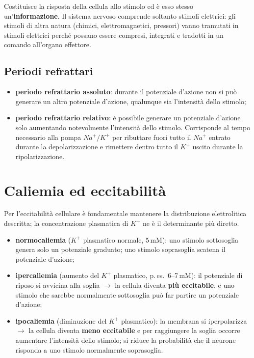 Costituisce la risposta della cellula allo stimolo ed è esso stesso un'\textbf{informazione}. Il
sistema nervoso comprende soltanto stimoli elettrici: gli stimoli di altra natura (chimici,
elettromagnetici, pressori) vanno tramutati in stimoli elettrici perché possano essere compresi,
integrati e tradotti in un comando all'organo effettore.

\subsection{Periodi refrattari}

\begin{itemize}
  \item \textbf{periodo refrattario assoluto}: durante il potenziale d'azione non si può generare
    un altro potenziale d'azione, qualunque sia l'intensità dello stimolo;
  \item \textbf{periodo refrattario relativo}: è possibile generare un potenziale d'azione solo
    aumentando notevolmente l'intensità dello stimolo. Corrisponde al tempo necessario alla pompa
    $Na^+/K^+$ per ributtare fuori tutto il $Na^+$ entrato durante la depolarizzazione e rimettere
    dentro tutto il $K^+$ uscito durante la ripolarizzazione.
\end{itemize}

\section{Caliemia ed eccitabilità}

Per l'eccitabilità cellulare è fondamentale mantenere la distribuzione elettrolitica descritta; la
concentrazione plasmatica di $K^+$ ne è il determinante più diretto.
\begin{itemize}
  \item \textbf{normocaliemia} ($K^+$ plasmatico normale, 5\,mM): uno stimolo sottosoglia genera
    solo un potenziale graduato; uno stimolo soprasoglia scatena il potenziale d'azione;
  \item \textbf{ipercaliemia} (aumento del $K^+$ plasmatico, p.\,es.\ 6--7\,mM): il potenziale di
    riposo si avvicina alla soglia $\rightarrow$ la cellula diventa \textbf{più eccitabile}, e uno
    stimolo che sarebbe normalmente sottosoglia può far partire un potenziale d'azione;
  \item \textbf{ipocaliemia} (diminuzione del $K^+$ plasmatico): la membrana si iperpolarizza
    $\rightarrow$ la cellula diventa \textbf{meno eccitabile} e per raggiungere la soglia occorre
    aumentare l'intensità dello stimolo; si riduce la probabilità che il neurone risponda a uno
    stimolo normalmente soprasoglia.
\end{itemize}

